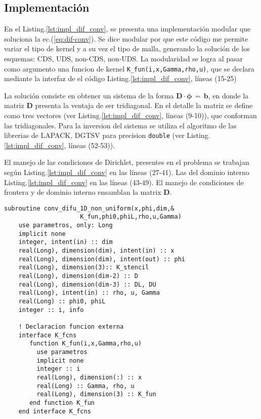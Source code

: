 \documentclass[9pt,technote,twoside,letterpaper,onecolumn]{IEEEtran}
\begin{document}
\begin{multicols}{2}
\subsection{Implementación}
\label{sec:imp_sol_dif_conv}

En el Listing.\ref{lst:impl_dif_conv}, se presenta una implementación modular que soluciona la ec.(\ref{eq:dif-conv}). Se dice modular por que este código me permite variar el tipo de kernel y a su vez el tipo de malla, generando la solución de los esquemas: CDS, UDS, non-CDS, non-UDS. La modularidad se logra al pasar como argumento una funcion de kernel \verb.K_fun(i,x,Gamma,rho,u)., que se declara mediante la interfaz de el código Listing.\ref{lst:impl_dif_conv}, líneas (15-25)

La solución consiste en obtener un sistema de la forma $\mathbf{D}\cdot\mathbf{\phi}\,=\,\mathbf{b}$, en donde la matriz $\mathbf{D}$ presenta la ventaja de ser tridiagonal. En el detalle la matriz se define como tres vectores (ver Listing.\ref{lst:impl_dif_conv}, líneas (9-10)), que conforman las tridiagonales. Para la inversion del sistema se utiliza el algoritmo de las librerias de LAPACK, DGTSV para precision \verb.double. (ver Listing.\ref{lst:impl_dif_conv}, líneas (52-53)). 

El manejo de las condiciones de Dirichlet, presentes en el problema se trabajan según Listing.\ref{lst:impl_dif_conv} en las líneas (27-41). Las del dominio interno Listing.\ref{lst:impl_dif_conv} en las líneas (43-49). El manejo de condiciones de frontera y de dominio interno ensamblan la matrix $\mathbf{D}$.

\begin{lstlisting}[caption={Algoritmo solución Difusión-Convección estacionario},label={lst:impl_dif_conv}]
  subroutine conv_difu_1D_non_uniform(x,phi,dim,&
                     K_fun,phi0,phiL,rho,u,Gamma)
    use parametros, only: Long        
    implicit none
    integer, intent(in) :: dim
    real(Long), dimension(dim), intent(in) :: x
    real(Long), dimension(dim), intent(out) :: phi
    real(Long), dimension(3):: K_stencil
    real(Long), dimension(dim-2) :: D
    real(Long), dimension(dim-3) :: DL, DU
    real(Long), intent(in) :: rho, u, Gamma
    real(Long) :: phi0, phiL
    integer :: i, info

    ! Declaracion funcion externa
    interface K_fcns
       function K_fun(i,x,Gamma,rho,u)
         use parametros
         implicit none
         integer :: i
         real(Long), dimension(:) :: x
         real(Long) :: Gamma, rho, u
         real(Long), dimension(3) :: K_fun
       end function K_fun
    end interface K_fcns


\end{lstlisting}
\end{multicols}
\end{document}
